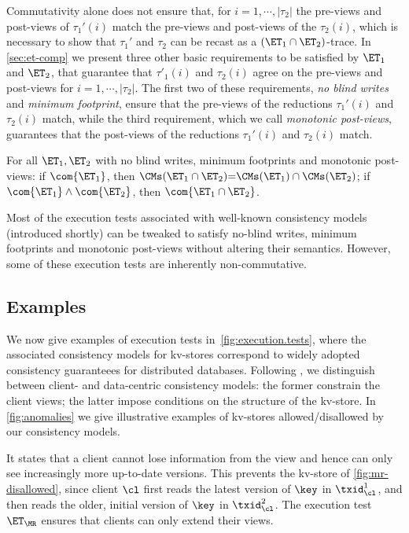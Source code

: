 Commutativity alone does not ensure that, for $i=1,\cdots,\lvert \tau_2 \rvert$ the 
pre-views and post-views of $\tau_1'(i)$ 
match the pre-views and post-views of the $\tau_2(i)$, which is necessary to show 
that $\tau_1'$ and $\tau_2$ can be recast as a $(\ET_1 \cap \ET_2)$-trace. 
In \cref{sec:et-comp} we present three other basic requirements to be 
satisfied by $\ET_1$ and $\ET_2$, that guarantee that $\tau'_1(i)$ and 
$\tau_2(i)$ agree on the pre-views and post-views for $i=1,\cdots, \lvert \tau_2 \rvert$. 
The first two of these requirements,  \emph{no blind writes} and \emph{minimum footprint}, 
ensure that the pre-views of the reductions $\tau_1'(i)$ and $\tau_2(i)$ match, 
while the third requirement, which we call \emph{monotonic post-views}, 
guarantees that the post-views of the reductions $\tau_1'(i)$ and $\tau_2(i)$ 
match. 
 
\begin{theorem}[Compositionality]  
\label{thm:compositional}   
For all $\ET_1, \ET_2$ with no blind writes, minimum footprints and monotonic post-views: 
if $\com{\ET_1}$, 
then $\CMs(\ET_1 \cap \ET_2) {=} \CMs(\ET_1) \cap \CMs(\ET_2)$;
if $\com{\ET_1} \land \com{\ET_2}$, then $\com{\ET_1 \cap \ET_2}$.
\end{theorem}

Most of the execution tests associated with well-known consistency models (introduced shortly)
can be tweaked to satisfy no-blind writes, minimum footprints and monotonic post-views 
without altering their semantics. However, some of these execution tests
are inherently non-commutative.


\subsection{Examples}\label{subsec:cm_examples}

We now give examples of execution tests in~\cref{fig:execution.tests},
where the associated consistency models for kv-stores correspond to
widely adopted consistency guaranteees for distributed databases.
Following \cite{distrprinciples}, we distinguish between
client- and data-centric consistency models: 
the former constrain the client views; 
the latter impose conditions on the structure of the kv-store.  
In \cref{fig:anomalies} we give illustrative
examples of kv-stores allowed/disallowed by our
consistency models.

It states that a client cannot lose information from the view and 
hence can only see increasingly more up-to-date versions. 
This prevents \eg the kv-store of \cref{fig:mr-disallowed},
since client $\cl$ first reads the latest version of $\key$ in $\txid_{\cl}^{1}$, 
and then reads the older, initial version of $\key$ in $\txid_{\cl}^{2}$.  
The execution test $\ET_{\MR}$ ensures that clients  can only extend their views. 

